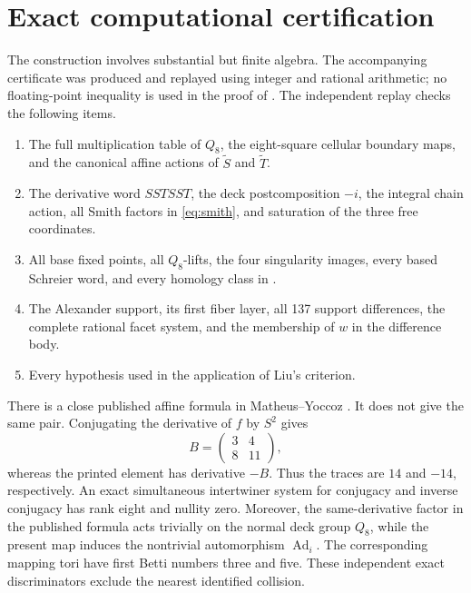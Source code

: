 \documentclass[10pt,reqno]{amsart}
\theoremstyle{definition}
\begin{document}
\section{Exact computational certification}

The construction involves substantial but finite algebra.  The accompanying
certificate was produced and replayed using integer and rational arithmetic;
no floating-point inequality is used in the proof of .  The
independent replay checks the following items.

\begin{enumerate}
\item The full multiplication table of \(Q_8\), the eight-square cellular
  boundary maps, and the canonical affine actions of \(\widetilde S\) and
  \(\widetilde T\).
\item The derivative word \(SSTSST\), the deck postcomposition \(-i\), the
  integral chain action, all Smith factors in \eqref{eq:smith}, and saturation
  of the three free coordinates.
\item All base fixed points, all \(Q_8\)-lifts, the four singularity images,
  every based Schreier word, and every homology class in
  .
\item The Alexander support, its first fiber layer, all 137 support
  differences, the complete rational facet system, and the membership of
  \(w\) in the difference body.
\item Every hypothesis used in the application of Liu's criterion.
\end{enumerate}

There is a close published affine formula in Matheus--Yoccoz
\cite[Remark~2.9]{MatheusYoccoz}.  It does not give the same pair.  Conjugating
the derivative of \(f\) by \(S^2\) gives
\[
 B=\begin{pmatrix}3&4\\8&11\end{pmatrix},
\]
whereas the printed element has derivative \(-B\).  Thus the traces are
\(14\) and \(-14\), respectively.  An exact simultaneous intertwiner system
for conjugacy and inverse conjugacy has rank eight and nullity zero.  Moreover,
the same-derivative factor in the published formula acts trivially on the
normal deck group \(Q_8\), while the present map induces the nontrivial
automorphism \(\operatorname{Ad}_i\).  The corresponding mapping tori have
first Betti numbers three and five.  These independent exact discriminators
exclude the nearest identified collision.
\end{document}

